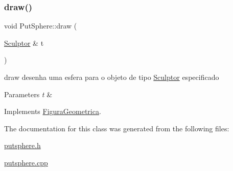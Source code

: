 \subsubsection{\texorpdfstring{draw()}{draw()}}
{\footnotesize\ttfamily void Put\+Sphere\+::draw (\begin{DoxyParamCaption}\item[{\hyperlink{class_sculptor}{Sculptor} \&}]{t }\end{DoxyParamCaption})\hspace{0.3cm}{\ttfamily [virtual]}}



draw desenha uma esfera para o objeto de tipo \hyperlink{class_sculptor}{Sculptor} especificado 


\begin{DoxyParams}{Parameters}
{\em t} & \\
\hline
\end{DoxyParams}


Implements \hyperlink{class_figura_geometrica_a34585fd7c0bd7378fc69c4ee208e676c}{Figura\+Geometrica}.



The documentation for this class was generated from the following files\+:\begin{DoxyCompactItemize}
\item 
\hyperlink{putsphere_8h}{putsphere.\+h}\item 
\hyperlink{putsphere_8cpp}{putsphere.\+cpp}\end{DoxyCompactItemize}
